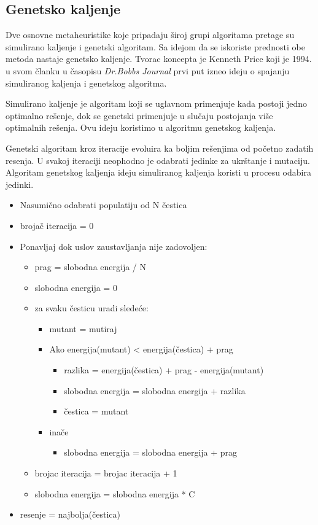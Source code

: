\documentclass[a4paper]{article}
\begin{document}
\subsection{Genetsko kaljenje}

Dve osnovne metaheuristike koje pripadaju široj grupi algoritama pretage su simulirano kaljenje i genetski algoritam. Sa idejom da se iskoriste prednosti obe metoda nastaje genetsko kaljenje.\cite{gk_master_rad} Tvorac koncepta je Kenneth Price koji je 1994. u svom članku u časopisu \emph{Dr.Bobbs Journal} prvi put izneo ideju o spajanju simuliranog kaljenja i genetskog algoritma. \par
Simulirano kaljenje je algoritam koji se uglavnom primenjuje kada postoji jedno optimalno rešenje, dok se genetski primenjuje u slučaju postojanja više optimalnih rešenja. Ovu ideju koristimo u algoritmu genetskog kaljenja. \par
Genetski algoritam kroz iteracije evoluira ka boljim rešenjima od početno zadatih resenja. U svakoj iteraciji neophodno je odabrati jedinke za ukrštanje i mutaciju. Algoritam genetskog kaljenja ideju simuliranog kaljenja koristi u procesu odabira jedinki.
\newline
\begin{itemize}
\item[]Nasumično odabrati populatiju od N čestica
\item[] brojač iteracija = 0
\item[]  Ponavljaj dok uslov zaustavljanja nije zadovoljen:
\begin{itemize}
\item[] prag = slobodna energija / N
\item[] slobodna energija = 0
\item[] za svaku česticu uradi sledeće:
\begin{itemize}
\item[] mutant = mutiraj
\item[] Ako energija(mutant) < energija(čestica) + prag
\begin{itemize}
\item[]razlika = energija(čestica) + prag - energija(mutant)
\item[]slobodna energija = slobodna energija + razlika
\item[]čestica = mutant
\end{itemize}
\item[]inače 
\begin{itemize}
\item[] slobodna energija = slobodna energija + prag
\end{itemize}
\end{itemize}
\item[]brojac iteracija = brojac iteracija + 1
\item[]slobodna energija = slobodna energija * C
\end{itemize}
\item[]resenje = najbolja(čestica)
\end{itemize}
\end{document}
